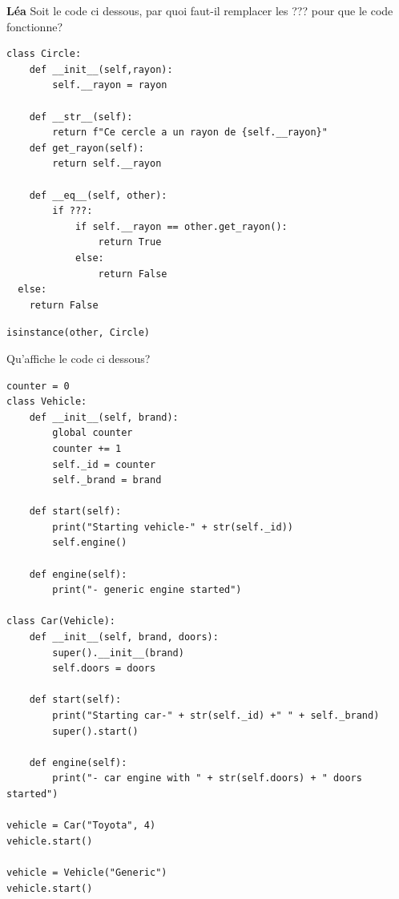 \begin{Exercice}[5 minutes]\textbf{Léa}
Soit le code ci dessous, par quoi faut-il remplacer les ??? pour que le code fonctionne?

\begin{lstlisting}[style=pythonstyle]
class Circle:
    def __init__(self,rayon):
        self.__rayon = rayon

    def __str__(self):
        return f"Ce cercle a un rayon de {self.__rayon}"
    def get_rayon(self):
        return self.__rayon

    def __eq__(self, other):
        if ???:
            if self.__rayon == other.get_rayon():
                return True
            else: 
                return False
  else:
    return False
\end{lstlisting}


\begin{solution}
\texttt{isinstance(other, Circle)}
\end{solution}

Qu'affiche le code ci dessous?
\begin{lstlisting}[style=pythonstyle]
counter = 0
class Vehicle:
    def __init__(self, brand):
        global counter
        counter += 1
        self._id = counter
        self._brand = brand

    def start(self):
        print("Starting vehicle-" + str(self._id))
        self.engine()

    def engine(self):
        print("- generic engine started")

class Car(Vehicle):
    def __init__(self, brand, doors):
        super().__init__(brand)
        self.doors = doors

    def start(self):
        print("Starting car-" + str(self._id) +" " + self._brand)
        super().start()

    def engine(self):
        print("- car engine with " + str(self.doors) + " doors started")

vehicle = Car("Toyota", 4)
vehicle.start()

vehicle = Vehicle("Generic")
vehicle.start()
\end{lstlisting}



\end{Exercice}

